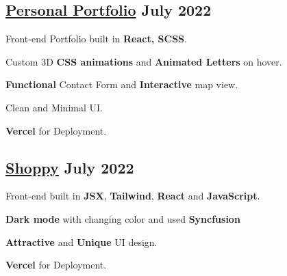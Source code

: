 \subsection{{\href{https://nidhikumari.vercel.app/}{Personal Portfolio} \hfill July 2022}}
\begin{zitemize}
\item Front-end Portfolio built in \textbf{React, SCSS}.
\item Custom 3D \textbf{ CSS animations } and \textbf{Animated Letters }on hover.
\item \textbf{Functional} Contact Form and \textbf{Interactive} map view.
\item Clean and Minimal UI.
\item \textbf{Vercel} for Deployment.
\end{zitemize}

\subsection{{\href{https://shoppy-brown.vercel.app/}{Shoppy} \hfill July 2022}}
\begin{zitemize}
\item Front-end built in \textbf{JSX}, \textbf{Tailwind}, \textbf{React} and \textbf{JavaScript}.
\item \textbf{Dark mode} with changing color and used \textbf{Syncfusion} 
\item \textbf{Attractive} and \textbf{Unique} UI design.
\item \textbf{Vercel} for Deployment.
\end{zitemize}




